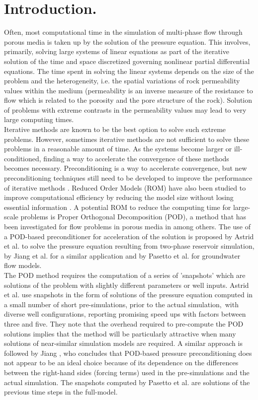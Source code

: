 \documentclass[12pt]{article}
\begin{document}
 \section{Introduction.}
  Often, most computational time in the simulation of multi-phase flow through porous media is taken 
  up by the solution of the pressure equation. 
This involves, primarily, solving large systems of linear equations as part of the iterative solution of the time and space discretized governing nonlinear partial differential 
equations. The time spent in solving the linear systems depends on the size of the problem and the heterogeneity, i.e. the spatial
variations of rock permeability values within the medium (permeability is an inverse measure of the resistance to flow which is related to the porosity and the pore structure of the rock). Solution of problems with extreme contrasts in the
permeability values may lead to very large computing times. \\
Iterative methods are known to be the best option to solve such extreme problems. However, sometimes iterative methods are not sufficient to solve these problems in a reasonable amount of time. As the systems become larger or ill-conditioned, finding a way to accelerate the convergence of these methods becomes necessary. Preconditioning is a way to accelerate convergence, but new preconditioning techniques still need to be developed to improve the performance of iterative methods \cite{Vuik02,Benzi02}.
Reduced Order Models (ROM) have also been studied to improve computational efficiency by reducing the model size without losing essential information \cite{Antoulas05,Schilders08,Quarteroni14}. 
A potential ROM to reduce the computing time for large-scale problems is Proper Orthogonal 
Decomposition (POD), a method that has been investigated for flow problems in porous media in \cite{Heijn04,Vermeulen04,Mark06,Doren06,Cardoso09,Astrid11,Krogstad11,Efendiev12,Jiang13,Pasetto16} among others. 
The use of a POD-based preconditioner for acceleration of the solution is proposed by Astrid et al.
\cite{Astrid11} to solve the pressure equation resulting from two-phase reservoir simulation, by Jiang et al. \cite{Jiang13} for a similar application and by Pasetto 
et al. \cite{Pasetto16} for groundwater flow models. \\
The POD method requires the computation of a series of 'snapshots' which are solutions of the problem with slightly 
different parameters or well inputs. Astrid et al. \cite{Astrid11} use snapshots in the form of solutions of the pressure equation computed in a small number of short pre-simulations, prior to the actual simulation,\ with diverse well configurations, reporting promising speed ups with factors between three and five. They note that the overhead required to pre-compute the POD solutions implies that the method will be particularly attractive when many solutions of near-similar simulation models are required. A similar approach is followed by Jiang \cite{Jiang13}, who concludes that POD-based pressure preconditioning does not appear to be an ideal choice because of its dependence on the differences between the right-hand sides (forcing terms) used in the pre-simulations and the actual simulation. The snapshots computed by Pasetto et al. \cite{Pasetto16} are solutions of the previous time steps in the full-model.
\end{document}
